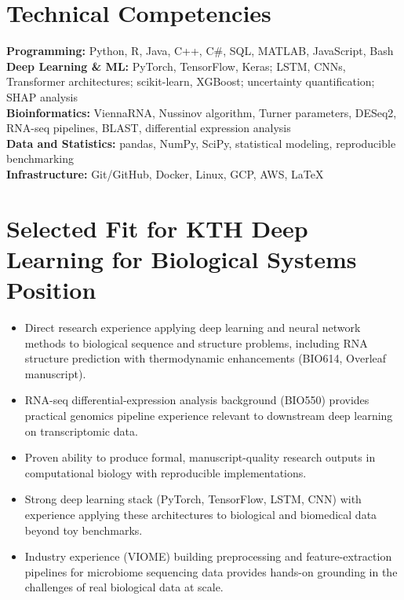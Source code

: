 \documentclass[11pt]{article}
\begin{document}
\section{Technical Competencies}
\textbf{Programming:} Python, R, Java, C++, C\#, SQL, MATLAB, JavaScript, Bash\\
\textbf{Deep Learning \& ML:} PyTorch, TensorFlow, Keras; LSTM, CNNs, Transformer architectures; scikit-learn, XGBoost; uncertainty quantification; SHAP analysis\\
\textbf{Bioinformatics:} ViennaRNA, Nussinov algorithm, Turner parameters, DESeq2, RNA-seq pipelines, BLAST, differential expression analysis\\
\textbf{Data and Statistics:} pandas, NumPy, SciPy, statistical modeling, reproducible benchmarking\\
\textbf{Infrastructure:} Git/GitHub, Docker, Linux, GCP, AWS, LaTeX

\section{Selected Fit for KTH Deep Learning for Biological Systems Position}
\begin{itemize}
  \item Direct research experience applying deep learning and neural network methods to biological sequence and structure problems, including RNA structure prediction with thermodynamic enhancements (BIO614, Overleaf manuscript).
  \item RNA-seq differential-expression analysis background (BIO550) provides practical genomics pipeline experience relevant to downstream deep learning on transcriptomic data.
  \item Proven ability to produce formal, manuscript-quality research outputs in computational biology with reproducible implementations.
  \item Strong deep learning stack (PyTorch, TensorFlow, LSTM, CNN) with experience applying these architectures to biological and biomedical data beyond toy benchmarks.
  \item Industry experience (VIOME) building preprocessing and feature-extraction pipelines for microbiome sequencing data provides hands-on grounding in the challenges of real biological data at scale.
\end{itemize}
\end{document}
